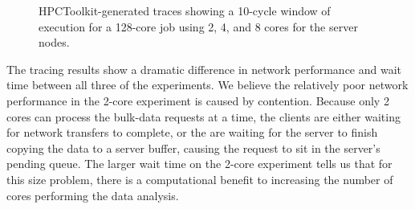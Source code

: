 \begin{figure}[htbp]
\begin{centering}
\vspace{-12pt}




\caption[Performance trace of 128-core run with different core
counts.]{HPCToolkit-generated traces showing a 10-cycle window of execution
for a 128-core job using 2, 4, and 8 cores for the server nodes.}
\label{fig:node-scaling-traces}
\end{centering}
\end{figure}

The tracing results show a dramatic difference in network performance and wait
time between all three of the experiments.  We believe the relatively poor
network performance in the 2-core experiment is caused by contention. Because
only 2 cores can process the bulk-data requests at a time, the clients are
either waiting for network transfers to complete, or the are waiting for the
server to finish copying the data to a server buffer, causing the request to
sit in the server's pending queue. The larger wait time on the 2-core experiment
tells us that for this size  problem, there is a computational benefit to
increasing the number of cores  performing the data analysis.



